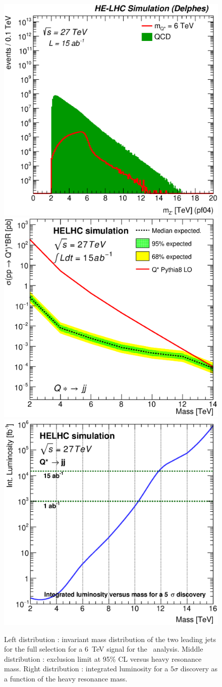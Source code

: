 \begin{figure}[!htb]
  \centering
  \includegraphics[width=0.30\columnwidth]{Fig/27tev/qq_Mj1j2_pf04_sel1_nostack_log.eps}
  \includegraphics[width=0.30\columnwidth]{Fig/27tev/lim_Qstar_jj_helhc_v01.eps}
  \includegraphics[width=0.30\columnwidth]{Fig/27tev/DiscoveryPotential_jj_rootStyle.eps}
  \caption{Left distribution : invariant mass distribution of the two leading jets for the full selection for a 6~TeV signal for the \qjj\ analysis. Middle distribution : exclusion limit at 95\% CL versus heavy resonance mass. Right distribution : integrated luminosity for a $5\sigma$ discovery as a function of the heavy resonance mass.}
  \label{figure:hadronicresonances27:qqsel01}
\end{figure}

\begin{table}[!htb]\centering
{}
\caption{Final yield of analysis.}
\label{tab:qqYield27}
\end{table}

\clearpage
\newpage
